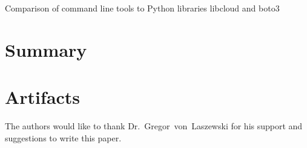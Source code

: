 Comparison of command line tools to Python libraries libcloud and boto3

\section{Summary}

\section{Artifacts}

\begin{acks}

  The authors would like to thank Dr.~Gregor~von~Laszewski for his
  support and suggestions to write this paper.

\end{acks}


 

